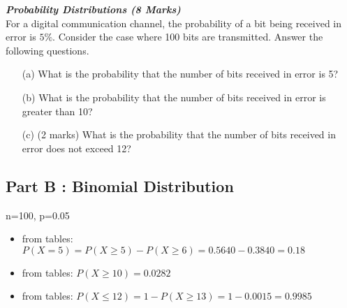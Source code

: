 
\bigskip

\item[(b)] \textbf{\textit{Probability Distributions (8 Marks)}}\\
For a digital communication channel, the probability of a bit being received in error is $5\%$. Consider the case where 100 bits are transmitted. Answer the following questions.

\begin{itemize}
\item[(a)] 	What is the probability that the number of bits received in error is 5?
\item[(b)]  What is the probability that the number of bits received in error is greater than 10?
\item[(c)] (2 marks)	What is the probability that the number of bits received in error does not exceed 12?
\end{itemize}


\subsection*{Part B : Binomial Distribution}
n=100, p=0.05
\begin{itemize}
\item from tables: $P(X=5) = P(X \geq 5) - P(X \geq 6) = 0.5640 - 0.3840 = 0.18$
\item from tables: $P(X \geq 10) = 0.0282$
\item from tables: $P(X \leq 12) = 1-P(X\geq 13) = 1- 0.0015 = 0.9985$
\end{itemize}
